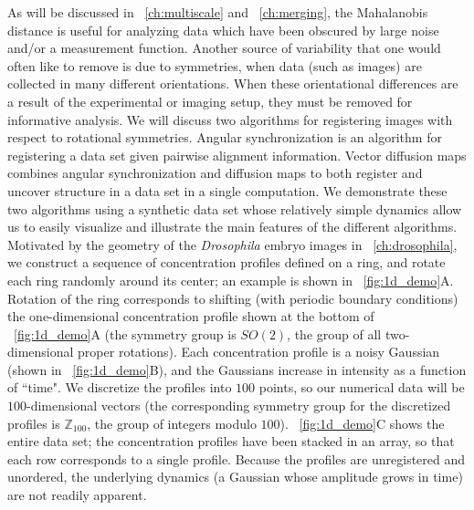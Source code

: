 As will be discussed in \chap~\ref{ch:multiscale} and \chap~\ref{ch:merging}, the Mahalanobis distance is useful for analyzing data which have been obscured by large noise and/or a measurement function. 
%
Another source of variability that one would often like to remove is due to symmetries, when data (such as images) are collected in many different orientations. 
%
When these orientational differences are a result of the experimental or imaging setup, they must be removed for informative analysis.
%
We will discuss two algorithms for registering images with respect to rotational symmetries. 
%
Angular synchronization \cite{singer2011angular} is an algorithm for registering a data set given pairwise alignment information. 
%
Vector diffusion maps \cite{singer2012vector} combines angular synchronization and diffusion maps to both register and uncover structure in a data set in a single computation. 
%
We demonstrate these two algorithms using a synthetic data set whose relatively simple dynamics allow us to easily visualize and illustrate the main features of the different algorithms.
%
Motivated by the geometry of the {\em Drosophila} embryo images in \chap~\ref{ch:drosophila}, we construct a sequence of concentration profiles defined on a ring, and rotate each ring randomly around its center; an example is shown in \fig~\ref{fig:1d_demo}A.
%
Rotation of the ring corresponds to shifting (with periodic boundary conditions) the one-dimensional concentration profile shown at the bottom of \fig~\ref{fig:1d_demo}A (the symmetry group is $SO(2)$, the group of all two-dimensional proper rotations).
%
Each concentration profile is a noisy Gaussian (shown in \fig~\ref{fig:1d_demo}B), and the Gaussians increase in intensity as a function of ``time".
%
We discretize the profiles into $100$ points, so our numerical data will be $100$-dimensional vectors (the corresponding symmetry group for the discretized profiles is $\mathbb{Z}_{100}$, the group of integers modulo $100$).
%
\fig~\ref{fig:1d_demo}C shows the entire data set; the concentration profiles have been stacked in an array, so that each row corresponds to a single profile.
%
Because the profiles are unregistered and unordered, the underlying dynamics (a Gaussian whose amplitude grows in time) are not readily apparent.

